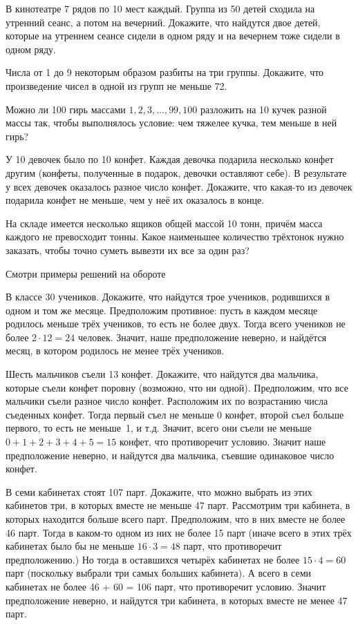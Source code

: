 \documentclass[12pt,a4paper]{article}
\begin{document}
 В кинотеатре 7 рядов по 10 мест каждый. Группа из 50 детей сходила на утренний сеанс, а потом на вечерний. Докажите, что найдутся двое детей, которые на утреннем сеансе сидели в одном ряду и на вечернем тоже сидели в одном ряду.

 Числа от 1 до 9 некоторым образом разбиты на три группы. Докажите, что произведение чисел в одной из групп не меньше 72.

 Можно ли 100 гирь массами $1,2,3,\ldots,99,100$ разложить на 10 кучек разной массы так, чтобы выполнялось условие: чем тяжелее кучка, тем меньше в ней гирь?

 У 10 девочек было по 10 конфет. Каждая девочка подарила несколько конфет другим (конфеты, полученные в подарок, девочки оставляют себе). В результате у всех девочек оказалось разное число конфет. Докажите, что какая-то из девочек подарила конфет не меньше, чем у неё их оказалось в конце.

 На складе имеется несколько ящиков общей массой 10 тонн, причём масса каждого не превосходит тонны. Какое наименьшее количество трёхтонок нужно заказать, чтобы точно суметь вывезти их все за один раз?


\vfill
\begin{center}
\large Смотри примеры решений на обороте
\end{center}
\newpage

В классе 30 учеников. Докажите, что найдутся трое учеников, родившихся в одном и том же месяце.
 Предположим противное: пусть в каждом месяце родилось меньше трёх
учеников, то есть не более двух. Тогда всего учеников не более $2 \cdot 12 = 24$ человек.  Значит, наше предположение неверно, и найдётся месяц, в котором родилось не менее трёх учеников.

Шесть мальчиков съели 13 конфет. Докажите, что найдутся два мальчика, которые съели конфет поровну (возможно, что ни одной).
 Предположим, что все мальчики съели разное число конфет. Расположим их по возрастанию числа съеденных конфет. Тогда первый съел не меньше 0 конфет, второй съел больше первого, то есть не меньше~1, и т.д. Значит, всего они съели не меньше $0 + 1 + 2 + 3 + 4 + 5 = 15$ конфет, что противоречит условию. Значит наше предположение неверно, и найдутся два мальчика, съевшие одинаковое число конфет.

В семи кабинетах стоят 107 парт. Докажите, что можно выбрать из этих кабинетов три, в которых вместе не меньше 47  парт.
 Рассмотрим три кабинета, в которых находится больше всего парт. Предположим, что в них вместе не более 46 парт. Тогда в каком-то одном из них не более
15 парт (иначе всего в этих трёх кабинетах было бы не меньше $16 \cdot 3 = 48$ парт, что противоречит предположению.) Но тогда в оставшихся четырёх кабинетах не более $15 \cdot 4 = 60$ парт (поскольку выбрали три самых больших кабинета). А всего в семи кабинетах не более
46 + 60 = 106 парт, что противоречит условию. Значит предположение неверно, и найдутся три кабинета, в которых вместе не менее 47 парт.
\end{document}
